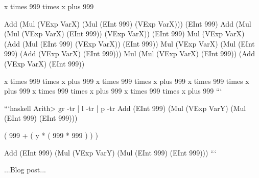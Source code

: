 x times 999 times x plus 999

Add (Mul (VExp VarX) (Mul (EInt 999) (VExp VarX))) (EInt 999) Add (Mul (Mul
(VExp VarX) (EInt 999)) (VExp VarX)) (EInt 999) Mul (VExp VarX) (Add (Mul (EInt
999) (VExp VarX)) (EInt 999)) Mul (VExp VarX) (Mul (EInt 999) (Add (VExp VarX)
(EInt 999))) Mul (Mul (VExp VarX) (EInt 999)) (Add (VExp VarX) (EInt 999))

x times 999 times x plus 999 x times 999 times x plus 999 x times 999 times x
plus 999 x times 999 times x plus 999 x times 999 times x plus 999 ```

```haskell Arith> gr -tr | l -tr | p -tr Add (EInt 999) (Mul (VExp VarY) (Mul
(EInt 999) (EInt 999)))

( 999 + ( y * ( 999 * 999 ) ) )

Add (EInt 999) (Mul (VExp VarY) (Mul (EInt 999) (EInt 999))) ```



...Blog post...



